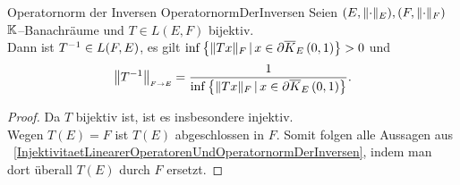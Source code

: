 \begin{korollar}{Operatornorm der Inversen}
                {OperatornormDerInversen}
Seien $(E,\lVert\cdot\rVert_E),(F,\lVert\cdot\rVert_F)$ $\mathbb{K}$--Banachräume und $T\in L(E,F)$
bijektiv.\\
Dann ist $T^{-1} \in L(F, E)$, es gilt
$\inf\left\{\lVert Tx\rVert_F\,|\,x \in\partial \overline K_{E}\left(0, 1\right)\right\}>0$ und\[
\left\|T^{-1}\right\|_{\scriptscriptstyle{F \rightarrow E}} = \frac 1 {\inf\left\{\lVert Tx\rVert_F\,|\,x \in\partial \overline K_{E}\left(0, 1\right)\right\}}\text.\]
\end{korollar}
\begin{proof}
Da $T$ bijektiv ist, ist es insbesondere injektiv.\\
Wegen $T(E) = F$ ist $T(E)$ abgeschlossen in $F$.
Somit folgen alle Aussagen aus
~\ref{InjektivitaetLinearerOperatorenUndOperatornormDerInversen},
indem man dort überall $T(E)$ durch $F$ ersetzt.
\end{proof}